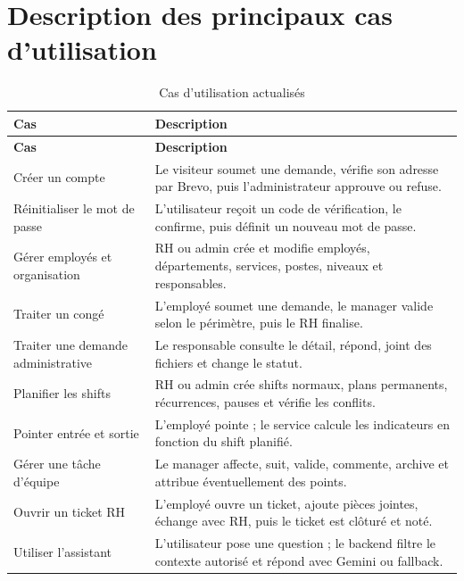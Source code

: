 \documentclass[12pt,a4paper]{report}
\begin{document}
\section{Description des principaux cas d'utilisation}
\begin{longtable}{p{4cm}p{10cm}}
\caption{Cas d'utilisation actualisés}\label{tab:cas-utilisation}\\
\toprule
\textbf{Cas} & \textbf{Description}\\
\midrule
\endfirsthead
\toprule
\textbf{Cas} & \textbf{Description}\\
\midrule
\endhead
Créer un compte & Le visiteur soumet une demande, vérifie son adresse par Brevo, puis l'administrateur approuve ou refuse.\\
Réinitialiser le mot de passe & L'utilisateur reçoit un code de vérification, le confirme, puis définit un nouveau mot de passe.\\
Gérer employés et organisation & RH ou admin crée et modifie employés, départements, services, postes, niveaux et responsables.\\
Traiter un congé & L'employé soumet une demande, le manager valide selon le périmètre, puis le RH finalise.\\
Traiter une demande administrative & Le responsable consulte le détail, répond, joint des fichiers et change le statut.\\
Planifier les shifts & RH ou admin crée shifts normaux, plans permanents, récurrences, pauses et vérifie les conflits.\\
Pointer entrée et sortie & L'employé pointe ; le service calcule les indicateurs en fonction du shift planifié.\\
Gérer une tâche d'équipe & Le manager affecte, suit, valide, commente, archive et attribue éventuellement des points.\\
Ouvrir un ticket RH & L'employé ouvre un ticket, ajoute pièces jointes, échange avec RH, puis le ticket est clôturé et noté.\\
Utiliser l'assistant & L'utilisateur pose une question ; le backend filtre le contexte autorisé et répond avec Gemini ou fallback.\\
\bottomrule
\end{longtable}
\end{document}
